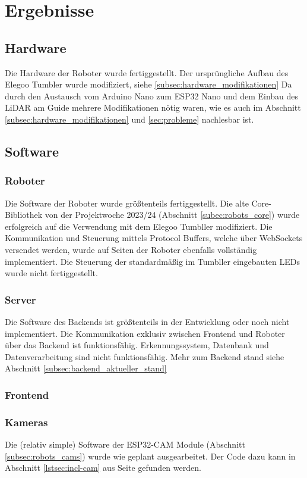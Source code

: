 \chapter{Ergebnisse}

\section{Hardware}
Die Hardware der Roboter wurde fertiggestellt.
Der ursprüngliche Aufbau des Elegoo Tumbler wurde modifiziert, siehe \ref{subsec:hardware_modifikationen}
Da durch den Austausch vom Arduino Nano zum ESP32 Nano und dem Einbau des LiDAR am Guide
mehrere Modifikationen nötig waren,
wie es auch im Abschnitt \ref{subsec:hardware_modifikationen} und \ref{sec:probleme} nachlesbar ist.
\section{Software}

\subsection{Roboter}
Die Software der Roboter wurde größtenteils fertiggestellt.
%
Die alte Core-Bibliothek von der Projektwoche 2023/24 (Abschnitt \ref{subec:robots_core})
wurde erfolgreich auf die Verwendung mit dem Elegoo Tumbller modifiziert.
%
Die Kommunikation und Steuerung mittels Protocol Buffers,
welche über WebSockets versendet werden,
wurde auf Seiten der Roboter ebenfalls vollständig implementiert.
%
Die Steuerung der standardmäßig im Tumbller eingebauten LEDs wurde nicht fertiggestellt.
\subsection{Server}
Die Software des Backends ist größtenteils in der Entwicklung 
oder noch nicht implementiert.
% 
Die Kommunikation exklusiv zwischen Frontend und Roboter 
über das Backend ist funktionsfähig.
% 
Erkennungssystem, Datenbank und Datenverarbeitung sind nicht funktionsfähig.
% 
% 
Mehr zum Backend stand siehe Abschnitt \ref{subsec:backend_aktueller_stand}
% 
\subsection{Frontend}

\subsection{Kameras}
Die (relativ simple) Software der ESP32-CAM Module (Abschnitt \ref{subsec:robots_cams})
wurde wie geplant ausgearbeitet.
%
Der Code dazu kann in Abschnitt \ref{lstsec:incl-cam} aus Seite \pageref{lstsec:incl-cam} gefunden werden.